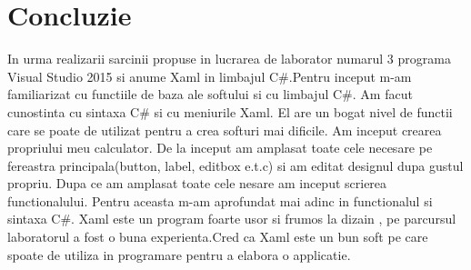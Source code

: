 \section*{Concluzie}
In urma realizarii sarcinii propuse in lucrarea de laborator numarul 3 programa  Visual Studio 2015 si anume Xaml in limbajul 
\textsc{\large C\#}.Pentru inceput m-am familiarizat cu functiile de baza ale softului si cu limbajul \textsc{\large C\#}. Am facut cunostinta cu sintaxa \textsc{\large C\#} si cu meniurile Xaml. El are un bogat nivel de functii care se poate de utilizat pentru a crea softuri mai dificile. Am inceput crearea propriului meu calculator. De la inceput am amplasat toate cele necesare pe fereastra principala(button, label, editbox e.t.c) si am editat designul dupa gustul propriu.  Dupa ce am amplasat toate cele nesare am inceput scrierea functionalului. Pentru aceasta m-am aprofundat mai adinc in functionalul si sintaxa \textsc{\large C\#}. Xaml este un program foarte usor si frumos la dizain , pe parcursul laboratorul a fost o buna experienta.Cred ca Xaml este un bun soft pe care spoate de utiliza in programare pentru a elabora o applicatie.
\clearpage